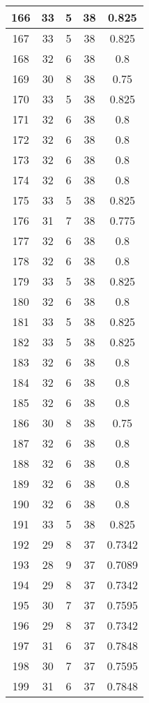 \documentclass[letterpaper, 12pt]{article}
\begin{document}
\begin{longtable}{|c|c|c|c|c|}
\hline
166 & 33 & 5 & 38 & 0.825 \\
\hline
167 & 33 & 5 & 38 & 0.825 \\
\hline
168 & 32 & 6 & 38 & 0.8 \\
\hline
169 & 30 & 8 & 38 & 0.75 \\
\hline
170 & 33 & 5 & 38 & 0.825 \\
\hline
171 & 32 & 6 & 38 & 0.8 \\
\hline
172 & 32 & 6 & 38 & 0.8 \\
\hline
173 & 32 & 6 & 38 & 0.8 \\
\hline
174 & 32 & 6 & 38 & 0.8 \\
\hline
175 & 33 & 5 & 38 & 0.825 \\
\hline
176 & 31 & 7 & 38 & 0.775 \\
\hline
177 & 32 & 6 & 38 & 0.8 \\
\hline
178 & 32 & 6 & 38 & 0.8 \\
\hline
179 & 33 & 5 & 38 & 0.825 \\
\hline
180 & 32 & 6 & 38 & 0.8 \\
\hline
181 & 33 & 5 & 38 & 0.825 \\
\hline
182 & 33 & 5 & 38 & 0.825 \\
\hline
183 & 32 & 6 & 38 & 0.8 \\
\hline
184 & 32 & 6 & 38 & 0.8 \\
\hline
185 & 32 & 6 & 38 & 0.8 \\
\hline
186 & 30 & 8 & 38 & 0.75 \\
\hline
187 & 32 & 6 & 38 & 0.8 \\
\hline
188 & 32 & 6 & 38 & 0.8 \\
\hline
189 & 32 & 6 & 38 & 0.8 \\
\hline
190 & 32 & 6 & 38 & 0.8 \\
\hline
191 & 33 & 5 & 38 & 0.825 \\
\hline
192 & 29 & 8 & 37 & 0.7342 \\
\hline
193 & 28 & 9 & 37 & 0.7089 \\
\hline
194 & 29 & 8 & 37 & 0.7342 \\
\hline
195 & 30 & 7 & 37 & 0.7595 \\
\hline
196 & 29 & 8 & 37 & 0.7342 \\
\hline
197 & 31 & 6 & 37 & 0.7848 \\
\hline
198 & 30 & 7 & 37 & 0.7595 \\
\hline
199 & 31 & 6 & 37 & 0.7848 \\
\hline
\end{longtable}
\end{document}
